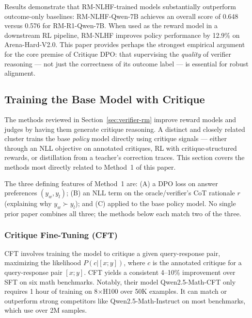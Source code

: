 Results demonstrate that RM-NLHF-trained models substantially outperform outcome-only baselines: RM-NLHF-Qwen-7B achieves an overall score of 0.648 versus 0.576 for RM-R1-Qwen-7B. When used as the reward model in a downstream RL pipeline, RM-NLHF improves policy performance by 12.9\% on Arena-Hard-V2.0. This paper provides perhaps the strongest empirical argument for the core premise of Critique DPO: that supervising the \emph{quality} of verifier reasoning --- not just the correctness of its outcome label --- is essential for robust alignment.

\subsection{Training the Base Model with Critique}
\label{sec:base-critique}

The methods reviewed in Section~\ref{sec:verifier-rm} improve reward models and judges by having them generate critique reasoning. A distinct and closely related cluster trains the base \emph{policy} model directly using critique signals --- either through an NLL objective on annotated critiques, RL with critique-structured rewards, or distillation from a teacher's correction traces. This section covers the methods most directly related to Method~1 of this paper.

The three defining features of Method~1 are: (A) a DPO loss on answer preferences $(y_w, y_l)$; (B) an NLL term on the oracle/verifier's CoT rationale $r$ (explaining why $y_w \succ y_l$); and (C) applied to the base policy model. No single prior paper combines all three; the methods below each match two of the three.

\subsubsection{Critique Fine-Tuning (CFT)}

\autocite{wang2025critiquefinetuninglearningcritique} CFT involves training the model to critique a given query-response pair, maximizing the likelihood $P(c|[x;y])$, where $c$ is the annotated critique for a query-response pair $[x;y]$. CFT yields a consistent 4--10\% improvement over SFT on six math benchmarks. Notably, their model Qwen2.5-Math-CFT only requires 1 hour of training on 8$\times$H100 over 50K examples. It can match or outperform strong competitors like Qwen2.5-Math-Instruct on most benchmarks, which use over 2M samples.

